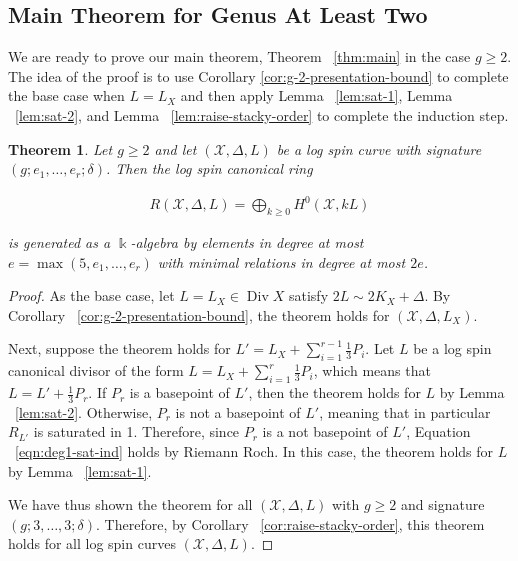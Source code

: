 \documentclass{amsart}
\theoremstyle{plain}
\newtheorem{thm}{Theorem}[section]
\theoremstyle{definition}
\theoremstyle{remark}
\numberwithin{equation}{section}
\newcommand\ssec{\subsection}
\newcommand\Bk{{\Bbbk}}
\DeclareMathOperator\di{Div}
\newcommand\sx{\mathscr X}
\newcommand{\halfcan}{L}
\begin{document}
\ssec{Main Theorem for Genus At Least Two}
\label{ssec:g-high-main}

We are ready to prove our main theorem, Theorem ~\ref{thm:main} in the case
$g \geq 2$. The idea of the proof is to use Corollary \ref{cor:g-2-presentation-bound} to 
complete the base case when $L = \halfcan_X$ and then apply Lemma
~\ref{lem:sat-1}, Lemma ~\ref{lem:sat-2}, and Lemma
~\ref{lem:raise-stacky-order} to complete the induction step.

\begin{thm}
\label{thm:g-high-main}
Let $g \geq 2$ and let $(\sx, \Delta, \halfcan)$ be a log spin curve
with signature $(g; e_1, \ldots, e_r; \delta)$. Then the
log spin canonical ring

\begin{align*}
	R(\sx, \Delta, \halfcan) = \bigoplus_{k \geq 0} H^0(\sx, k L )
\end{align*}

\noindent
is generated as a $\Bk$-algebra by elements in degree at most $e =
\max(5, e_1, \ldots, e_r)$ with minimal relations in degree at most $2e$.
\end{thm}

\begin{proof}
As the base case, let $\halfcan = \halfcan_X \in \di X$ satisfy $2 \halfcan \sim 2 K_X + \Delta$.
By Corollary ~\ref{cor:g-2-presentation-bound}, the theorem holds for $(\sx, \Delta,
\halfcan_X)$. 

Next, suppose the theorem holds for $\halfcan' = \halfcan_X + \sum_{i=1}^{r-1} \frac{1}{3}P_i$. Let $\halfcan$ be a log spin canonical divisor of the form $\halfcan = \halfcan_X + \sum_{i = 1}^r \frac{1}{3} P_i$, which means that $\halfcan = \halfcan' + \frac{1}{3} P_r$.  If $P_r$ is a basepoint of $\halfcan'$, then the theorem holds for $\halfcan$ by Lemma ~\ref{lem:sat-2}.
Otherwise, $P_r$ is not a basepoint of $\halfcan'$, meaning that in particular $R_{\halfcan'}$ is saturated in 1.
Therefore, since $P_r$ is a not basepoint of $\halfcan'$, Equation
~\ref{eqn:deg1-sat-ind} holds by Riemann Roch.
In this case, the theorem holds for $\halfcan$ by Lemma ~\ref{lem:sat-1}.

We have thus shown the theorem for all $(\sx, \Delta, \halfcan)$ with $g \ge 2$ and signature $(g; 3, \ldots, 3; \delta)$. Therefore, by Corollary 
~\ref{cor:raise-stacky-order}, this theorem 
holds for all log spin curves $(\sx, \Delta, \halfcan)$. 
\end{proof}
\end{document}
